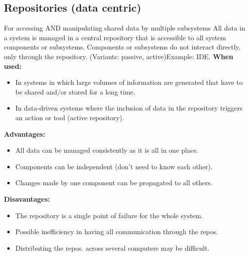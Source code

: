 \documentclass[../ESOF_notes.tex]{subfiles}
\begin{document}
     \subsection{Repositories (data centric)} 
     For accessing AND manipulating shared data by multiple subsystems\newline\newline
        All data in a system is managed in a central repository that is accessible to all system components or subsystems. Components or subsystems do not interact directly, only through the repository. (Variants: passive, active)\newline Example: IDE. \newline\newline
        \textbf{When used:} 
        \begin{itemize}
            \item In systems in which large volumes of information are generated that have to be shared and/or stored for a long time.
            \item In data-driven systems where the inclusion of data in the repository triggers an action or tool (active repository).
        \end{itemize}
        \textbf{Advantages:} 
        \begin{itemize}
            \item All data can be managed consistently as it is all in one place.
            \item Components can be independent (don’t need to know each other).
            \item Changes made by one component can be propagated to all others.
        \end{itemize}
        \textbf{Disavantages:}
        \begin{itemize}
            \item The repository is a single point of failure for the whole system.
            \item Possible inefficiency in having all communication through the repos.
            \item Distributing the repos. across several computers may be difficult.
        \end{itemize}
        
\end{document}
